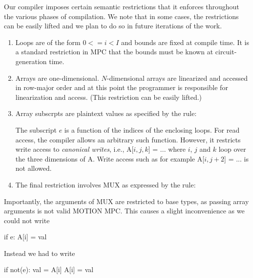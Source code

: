 Our compiler imposes certain semantic restrictions that it enforces throughout the various
phases of compilation. We note that in some cases, the restrictions
can be easily lifted and we plan to do so in future iterations of the work.

\begin{enumerate}
\item Loops are of the form $0 <= i < I$ and bounds are fixed at compile time.
It is a standard restriction in MPC that the bounds must be known at circuit-generation time.
\item Arrays are one-dimensional. $N$-dimensional arrays are linearized and accessed
in row-major order and at this point the programmer is responsible for linearization
and access. (This restriction can be easily lifted.)
\item Array subscrpts are plaintext values as specified by the rule:
\begin{semantics}
\end{semantics}
The subscript $e$ is a function of the indices of the enclosing loops.
For read access, the compiler allows an arbitrary such function.
However, it restricts write access to \emph{canonical writes}, i.e., {\sf A[$i,j,k$] = ...}
where $i$, $j$ and $k$ loop over the three dimensions of {\sf A}.
Write access such as for example {\sf A[$i,j+2$] = ...} is not allowed.
\item The final restriction involves MUX as expressed by the rule:
\begin{semantics}
\end{semantics}
\end{enumerate}
Importantly, the arguments of MUX are restricted to base types, as passing array arguments
is not valid MOTION MPC.  This causes a slight inconvenience as we could not write
\begin{pythonn}
if e: A[i] = val
\end{pythonn}
Instead we had to write
\begin{pythonn}
if not(e): val = A[i]
A[i] = val
\end{pythonn}

